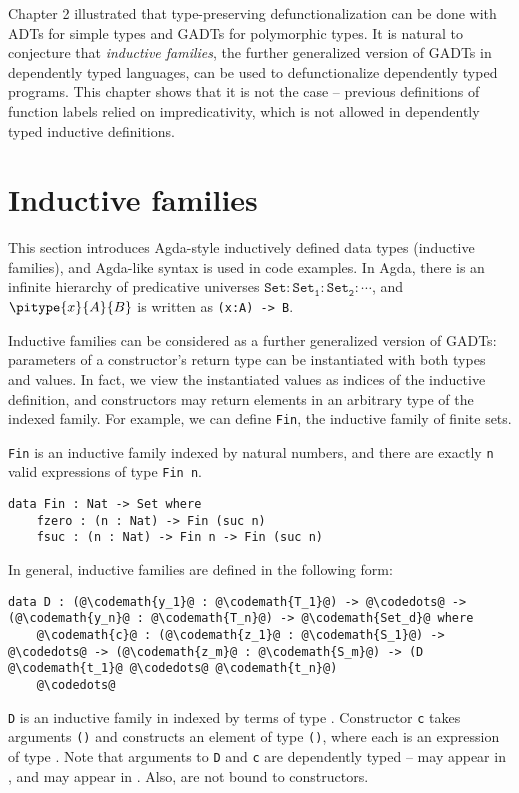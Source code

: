 
Chapter 2 illustrated that type-preserving defunctionalization can be done with ADTs for simple types and GADTs for polymorphic types. It is natural to conjecture that \textit{inductive families}, the further generalized version of GADTs in dependently typed languages, can be used to defunctionalize dependently typed programs. This chapter shows that it is not the case -- previous definitions of function labels relied on impredicativity, which is not allowed in dependently typed inductive definitions.

\section{Inductive families}

This section introduces Agda-style inductively defined data types (inductive families), and Agda-like syntax is used in code examples. In Agda, there is an infinite hierarchy of predicative universes $\mathtt{Set : Set_1 : Set_2 : \cdots}$, and $\pitype{x}{A}{B}$ is written as \texttt{(x:A) -> B}. 

Inductive families can be considered as a further generalized version of GADTs: parameters of a constructor's return type can be instantiated with both types and values. In fact, we view the instantiated values as indices of the inductive definition, and constructors may return elements in an arbitrary type of the indexed family. For example, we can define \texttt{Fin}, the inductive family of finite sets.

\begin{exmp} \texttt{Fin} is an inductive family indexed by natural numbers, and there are exactly \texttt{n} valid expressions of type \texttt{Fin n}.
\begin{lstlisting}[escapechar=@]
data Fin : Nat -> Set where
    fzero : (n : Nat) -> Fin (suc n)
    fsuc : (n : Nat) -> Fin n -> Fin (suc n)
\end{lstlisting}
\end{exmp}

In general, inductive families are defined in the following form:
\begin{lstlisting}[escapechar=@]
data D : (@\codemath{y_1}@ : @\codemath{T_1}@) -> @\codedots@ -> (@\codemath{y_n}@ : @\codemath{T_n}@) -> @\codemath{Set_d}@ where
    @\codemath{c}@ : (@\codemath{z_1}@ : @\codemath{S_1}@) -> @\codedots@ -> (@\codemath{z_m}@ : @\codemath{S_m}@) -> (D @\codemath{t_1}@ @\codedots@ @\codemath{t_n}@)
    @\codedots@
\end{lstlisting}
\texttt{D} is an inductive family in  indexed by terms of type . Constructor \texttt{c} takes arguments \texttt{()} and constructs an element of type \texttt{()}, where each  is an expression of type . Note that arguments to \texttt{D} and \texttt{c} are dependently typed --  may appear in , and  may appear in . Also,  are not bound to constructors.

